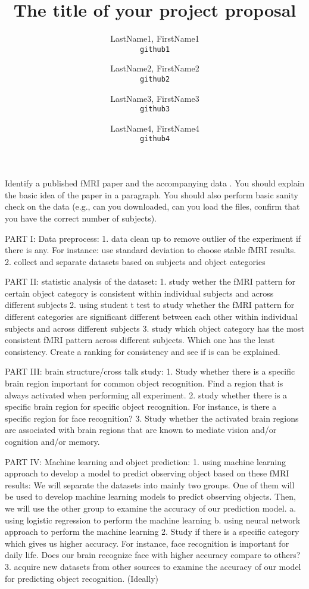 \documentclass[11pt]{article}
\title{The title of your project proposal}
\author{
  LastName1, FirstName1\\
  \texttt{github1}
  \and
  LastName2, FirstName2\\
  \texttt{github2}
  \and
  LastName3, FirstName3\\
  \texttt{github3}
  \and
  LastName4, FirstName4\\
  \texttt{github4}
}
\begin{document}
\maketitle

Identify a published fMRI paper and the accompanying data
\cite{lindquist2008statistical}.  You should explain the basic idea of the
paper in a paragraph.  You should also perform basic sanity check on the data
(e.g., can you downloaded, can you load the files, confirm that you have the
correct number of subjects).



PART I: Data preprocess:
1. data clean up to remove outlier of the experiment if there is any.
For instance: use standard deviation to choose stable fMRI results.
2. collect and separate datasets based on subjects and object categories

PART II: statistic analysis of the dataset:
1. study wether the fMRI pattern for certain object category is consistent 
within individual subjects and across different subjects
2. using student t test to study whether the fMRI pattern for different 
categories are significant different between each other within individual 
subjects and across different subjects
3. study which object category has the most consistent fMRI pattern across 
different subjects. Which one has the least consistency. 
Create a ranking for consistency and see if is can be explained.

PART III: brain structure/cross talk study:
1. Study whether there is a specific brain region important for common 
object recognition. Find a region that is always activated when 
performing all experiment.
2. study whether there is a specific brain region for specific object 
recognition. For instance, is there a specific region for face recognition?
3. Study whether the activated brain regions are associated with brain 
regions that are known to mediate vision and/or cognition and/or memory.

PART IV: Machine learning and object prediction:
1. using machine learning approach to develop a model to predict observing 
object based on these fMRI results:
We will separate the datasets into mainly two groups. One of them will 
be used to develop machine learning models to predict observing objects. 
Then, we will use the other group to examine the accuracy of our 
prediction model.
a. using logistic regression to perform the machine learning
b. using neural network approach to perform the machine learning
2. Study if there is a specific category which gives us higher accuracy. 
For instance, face recognition is important for daily life. 
Does our brain recognize face with higher accuracy compare to others?
3. acquire new datasets from other sources to examine the accuracy of 
our model for predicting object recognition. (Ideally)

 


\end{document}
